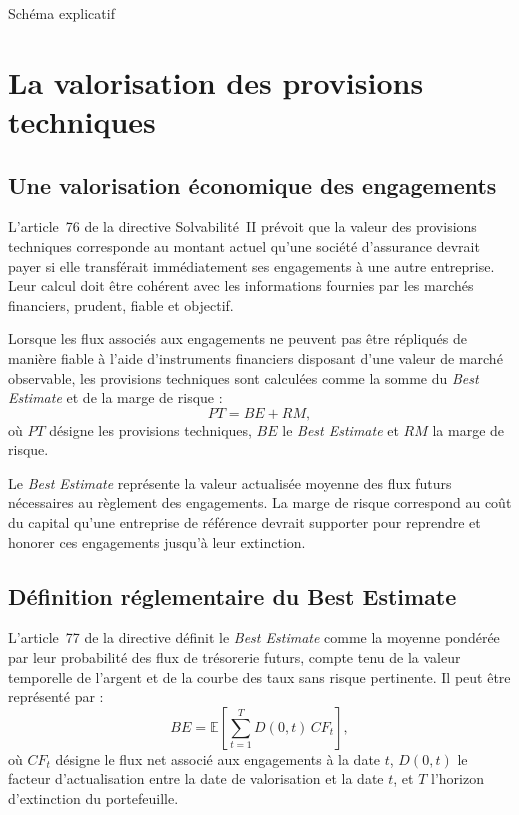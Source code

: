Schéma explicatif

\section{La valorisation des provisions techniques}

\subsection{Une valorisation économique des engagements}

L'article~76 de la directive Solvabilité~II prévoit que la valeur des
provisions techniques corresponde au montant actuel qu'une société
d'assurance devrait payer si elle transférait immédiatement ses engagements à
une autre entreprise. Leur calcul doit être cohérent avec les informations
fournies par les marchés financiers, prudent, fiable et objectif.

Lorsque les flux associés aux engagements ne peuvent pas être répliqués de
manière fiable à l'aide d'instruments financiers disposant d'une valeur de
marché observable, les provisions techniques sont calculées comme la somme du
\textit{Best Estimate} et de la marge de risque :
\[
    PT = BE + RM,
\]
où \(PT\) désigne les provisions techniques, \(BE\) le
\textit{Best Estimate} et \(RM\) la marge de risque.

Le \textit{Best Estimate} représente la valeur actualisée moyenne des flux
futurs nécessaires au règlement des engagements. La marge de risque correspond
au coût du capital qu'une entreprise de référence devrait supporter pour
reprendre et honorer ces engagements jusqu'à leur extinction. 

\subsection{Définition réglementaire du Best Estimate}

L'article~77 de la directive définit le \textit{Best Estimate} comme la moyenne
pondérée par leur probabilité des flux de trésorerie futurs, compte tenu de la
valeur temporelle de l'argent et de la courbe des taux sans risque pertinente. Il peut être représenté
par :
\[
    BE =
    \mathbb{E}\left[
        \sum_{t=1}^{T}
        D(0,t)\,CF_t
    \right],
\]
où \(CF_t\) désigne le flux net associé aux engagements à la date \(t\),
\(D(0,t)\) le facteur d'actualisation entre la date de valorisation et la date
\(t\), et \(T\) l'horizon d'extinction du portefeuille.

